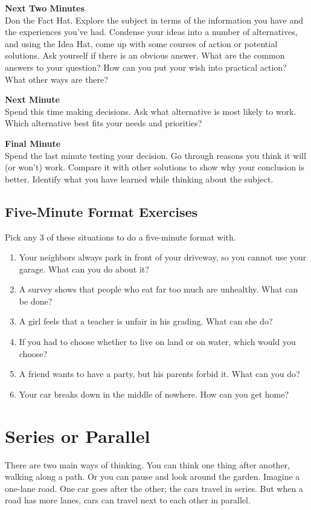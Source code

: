 \textbf{Next Two Minutes} \\
Don the Fact Hat. Explore the subject in terms of the information you have and the experiences you've had. Condense your ideas into a number of alternatives, and using the Idea Hat, come up with some courses of action or potential solutions. Ask yourself if there is an obvious answer. What are the common answers to your question? How can you put your wish into practical action? What other ways are there?

\textbf{Next Minute} \\
Spend this time making decisions. Ask what alternative is most likely to work. Which alternative best fits your needs and priorities?

\textbf{Final Minute} \\
Spend the last minute testing your decision. Go through reasons you think it will (or won't) work. Compare it with other solutions to show why your conclusion is better. Identify what you have learned while thinking about the subject.

\section*{Five-Minute Format Exercises}

Pick any 3 of these situations to do a five-minute format with.
\begin{enumerate}
	\item Your neighbors always park in front of your driveway, so you cannot use your garage. What can you do about it?
	\item A survey shows that people who eat far too much are unhealthy. What can be done?
	\item A girl feels that a teacher is unfair in his grading. What can she do?
	\item If you had to choose whether to live on land or on water, which would you choose?
	\item A friend wants to have a party, but his parents forbid it. What can you do?
	\item Your car breaks down in the middle of nowhere. How can you get home?
\end{enumerate}


\chapter{Series or Parallel}

There are two main ways of thinking. You can think one thing after another, walking along a path. Or you can pause and look around the garden. Imagine a one-lane road. One car goes after the other; the cars travel in series. But when a road has more lanes, cars can travel next to each other in parallel.


